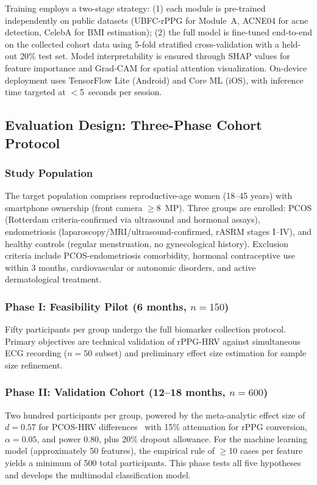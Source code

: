 \documentclass[conference]{IEEEtran}
\begin{document}
Training employs a two-stage strategy: (1) each module is pre-trained independently on public datasets (UBFC-rPPG for Module~A, ACNE04 for acne detection, CelebA for BMI estimation); (2) the full model is fine-tuned end-to-end on the collected cohort data using 5-fold stratified cross-validation with a held-out 20\% test set. Model interpretability is ensured through SHAP values for feature importance and Grad-CAM for spatial attention visualization. On-device deployment uses TensorFlow Lite (Android) and Core ML (iOS), with inference time targeted at $<$5~seconds per session.

\subsection{Evaluation Design: Three-Phase Cohort Protocol}

\subsubsection{Study Population}
The target population comprises reproductive-age women (18--45 years) with smartphone ownership (front camera $\geq$8~MP). Three groups are enrolled: PCOS (Rotterdam criteria-confirmed via ultrasound and hormonal assays), endometriosis (laparoscopy/MRI/ultrasound-confirmed, rASRM stages I--IV), and healthy controls (regular menstruation, no gynecological history). Exclusion criteria include PCOS-endometriosis comorbidity, hormonal contraceptive use within 3 months, cardiovascular or autonomic disorders, and active dermatological treatment.

\subsubsection{Phase I: Feasibility Pilot (6 months, $n=150$)}
Fifty participants per group undergo the full biomarker collection protocol. Primary objectives are technical validation of rPPG-HRV against simultaneous ECG recording ($n=50$ subset) and preliminary effect size estimation for sample size refinement.

\subsubsection{Phase II: Validation Cohort (12--18 months, $n=600$)}
Two hundred participants per group, powered by the meta-analytic effect size of $d=0.57$ for PCOS-HRV differences~\cite{Mirzohreh_2024} with 15\% attenuation for rPPG conversion, $\alpha=0.05$, and power 0.80, plus 20\% dropout allowance. For the machine learning model (approximately 50 features), the empirical rule of $\geq$10 cases per feature yields a minimum of 500 total participants. This phase tests all five hypotheses and develops the multimodal classification model.
\end{document}
